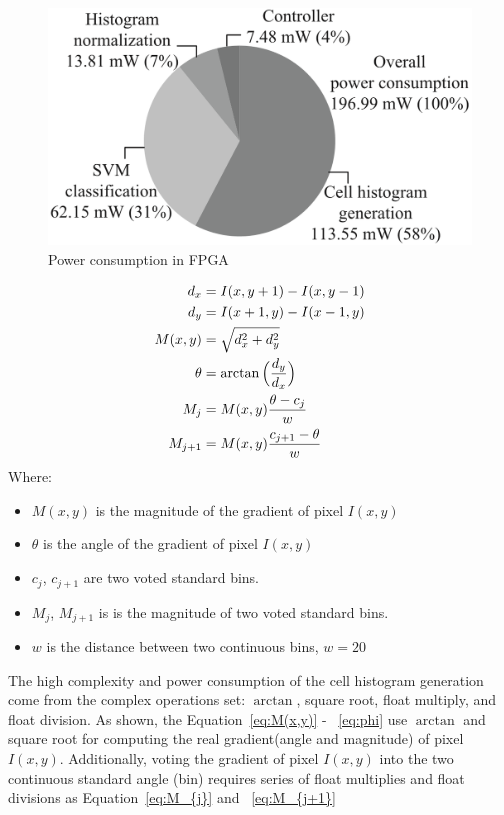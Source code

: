 \begin{figure}[t]
	\def\sscale{1.0\linewidth}
	\includegraphics[width=\sscale]{"imgs/power consumption in FPGA"}
	\caption{Power consumption in FPGA~\cite{takagi2013sdh}}
	\label{fig:power_consumption_in_FPGA}
\end{figure}
\begin{align}
	 d_{x} &= I(x, y + 1) - I (x, y - 1) \label{eq:dx} \\
	 d_{y} &= I(x + 1, y) - I (x - 1, y) \label{eq:dy} \\
	 M(x,y)     &= \sqrt{ d_x^2 + d_y^2 } \label{eq:M(x,y)} \\
	 \theta       &= \arctan\Big( {\frac{d_y}{d_x}} \Big) \label{eq:phi} \\
	 M_{j}      &= M(x,y) \frac{\theta - c_j}{w}  \label{eq:M_{j}} \\
	 M_{j + 1}  &= M(x,y) \frac{c_{j+1} - \theta}{w} \label{eq:M_{j+1}}
\end{align}
Where:\\
\begin{itemize}
	\item $M(x,y)$ is the magnitude of the gradient of pixel $I(x,y)$
	\item $\theta$ is the angle of the gradient of pixel $I(x,y)$
	\item $c_j$, $c_{j+1}$ are two voted standard bins.
	\item $M_j$, $M_{j+1}$ is is the magnitude of two voted standard bins.
	\item $w$ is the distance between two continuous bins, $w = 20$
\end{itemize}


The high complexity and power consumption of the cell histogram generation come
from the complex operations set: $\arctan $, square root, float
multiply, and float division.
As shown, the Equation~\ref{eq:M(x,y)} - ~\ref{eq:phi} use $\arctan$ and
square root for computing the real gradient(angle and magnitude) of
pixel $I(x,y)$.
Additionally, voting the gradient of pixel $I(x,y)$ into the two continuous standard angle
(bin) requires series of float multiplies and float divisions as
Equation~\ref{eq:M_{j}} and ~\ref{eq:M_{j+1}}

